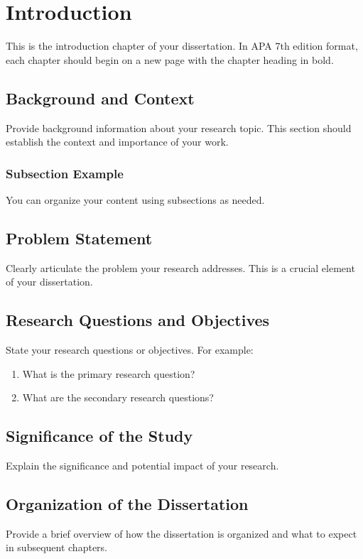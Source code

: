 \chapter{Introduction}

This is the introduction chapter of your dissertation. In APA 7th edition format, each chapter should begin on a new page with the chapter heading in bold.

\section{Background and Context}

Provide background information about your research topic. This section should establish the context and importance of your work.

\subsection{Subsection Example}

You can organize your content using subsections as needed.

\section{Problem Statement}

Clearly articulate the problem your research addresses. This is a crucial element of your dissertation.

\section{Research Questions and Objectives}

State your research questions or objectives. For example:

\begin{enumerate}
\item What is the primary research question?
\item What are the secondary research questions?
\end{enumerate}

\section{Significance of the Study}

Explain the significance and potential impact of your research.

\section{Organization of the Dissertation}

Provide a brief overview of how the dissertation is organized and what to expect in subsequent chapters.

\newpage